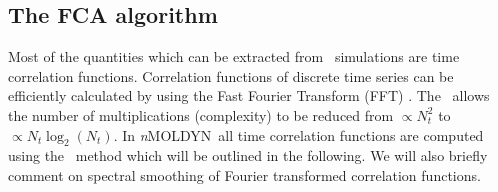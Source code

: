 \documentclass[a4paper,11pt]{report}
\newcommand{\NMOLDYN}{\textit{n}MOLDYN}
\begin{document}
\newpage
\appendix
\begin{appendices}
\chapter{The FCA algorithm}
\label{fca}
Most of the quantities which can be extracted from \MD\ simulations are time correlation functions. 
Correlation functions of discrete time series can be efficiently calculated by using the Fast Fourier 
Transform (FFT) \cite{Brigham}. The \FCA\ allows the number of multiplications (complexity) to be reduced from $\propto N_t^2$ to $\propto N_t \log_2(N_t)$. In 
\NMOLDYN\ all time correlation functions are computed using the \FCA\ method which will be outlined in the 
following. We will also briefly comment on spectral smoothing of Fourier transformed correlation functions.


\end{appendices}
\end{document}
